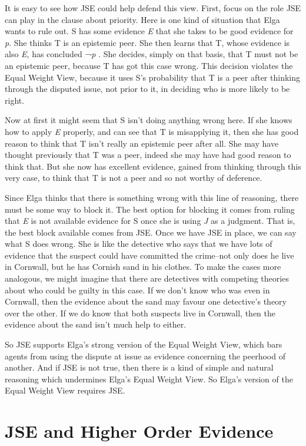 \documentclass[
  10pt,
  letterpaper,
  twoside]{scrbook}
\begin{document}
It is easy to see how JSE could help defend this view. First, focus on
the role JSE can play in the clause about priority. Here is one kind of
situation that Elga wants to rule out. S has some evidence \emph{E} that
she takes to be good evidence for \emph{p}. She thinks T is an epistemic
peer. She then learns that T, whose evidence is also \emph{E}, has
concluded ¬\emph{p} . She decides, simply on that basis, that T must not
be an epistemic peer, because T has got this case wrong. This decision
violates the Equal Weight View, because it uses S's probability that T
is a peer after thinking through the disputed issue, not prior to it, in
deciding who is more likely to be right.

Now at first it might seem that S isn't doing anything wrong here. If
she knows how to apply \emph{E} properly, and can see that T is
misapplying it, then she has good reason to think that T isn't really an
epistemic peer after all. She may have thought previously that T was a
peer, indeed she may have had good reason to think that. But she now has
excellent evidence, gained from thinking through this very case, to
think that T is not a peer and so not worthy of deference.

Since Elga thinks that there is something wrong with this line of
reasoning, there must be some way to block it. The best option for
blocking it comes from ruling that \emph{E} is not available evidence
for S once she is using \emph{J} as a judgment. That is, the best block
available comes from JSE. Once we have JSE in place, we can say what S
does wrong. She is like the detective who says that we have lots of
evidence that the suspect could have committed the crime--not only does
he live in Cornwall, but he has Cornish sand in his clothes. To make the
cases more analogous, we might imagine that there are detectives with
competing theories about who could be guilty in this case. If we don't
know who was even in Cornwall, then the evidence about the sand may
favour one detective's theory over the other. If we do know that both
suspects live in Cornwall, then the evidence about the sand isn't much
help to either.

So JSE supports Elga's strong version of the Equal Weight View, which
bars agents from using the dispute at issue as evidence concerning the
peerhood of another. And if JSE is not true, then there is a kind of
simple and natural reasoning which undermines Elga's Equal Weight View.
So Elga's version of the Equal Weight View requires JSE.

\section{JSE and Higher Order Evidence}\label{jseandhigherorderevidence}
\end{document}
